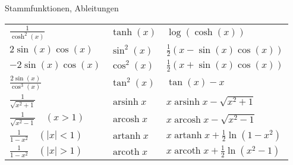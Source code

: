 \begin{Rechenregeln}{Stammfunktionen, Ableitungen}{}
\begin{longtable}{l|l|l}
        $\frac{1}{\cosh^2(x)}$ & $\tanh(x)$ & $\log(\cosh(x))$\\[1em]
        $2 \sin(x)\cos(x)$ & $\sin^2(x)$ & $\frac{1}{2}(x-\sin(x)\cos(x))$ \\[.5em]
        $-2\sin(x)\cos(x)$ & $\cos^2(x)$ & $\frac{1}{2}(x+\sin(x)\cos(x))$ \\[.5em]
        $\frac{2 \sin(x)}{\cos^3(x)}$ & $\tan^2(x)$ & $\tan(x) - x$\\[.5em]
        \(\frac{1}{\sqrt {x^2+1}}\)& \(\operatorname{arsinh} x\) & \(x \operatorname{arsinh} x -\sqrt{x^2+1}\)\\
        \(\frac{1}{\sqrt {x^2-1}} \quad (x>1)\)&\(\operatorname{arcosh} x\) & \(x \operatorname{arcosh} x -\sqrt{x^2-1}\)\\
        \(\frac{1}{1-x^2} \quad (\left| x \right|<1)\)&\(\operatorname{artanh} x\) & \(x \operatorname{artanh} x +\frac{1}{2}\ln{\left(1-x^2\right)}\)\\
        \(\frac{1}{1-x^2} \quad (\left| x \right|>1)\)&\(\operatorname{arcoth} x\) & \(x \operatorname{arcoth} x +\frac{1}{2}\ln{\left(x^2-1\right)}\)\\ 
    \end{longtable}
\end{Rechenregeln}

